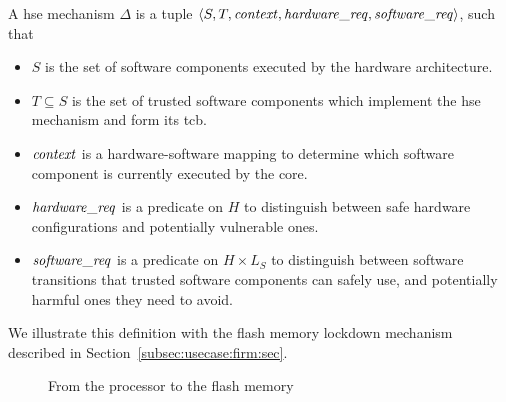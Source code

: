 \begin{definition}
  \label{def:speccert:hse}
  A \ac{hse} mechanism $\Delta$ is a tuple
  $\langle S, T, \mathit{context}, \mathit{hardware\_req}, \mathit{software\_req}
  \rangle$, such that
  \begin{itemize}
  \item $S$ is the set of software components executed by the hardware
    architecture.
  \item $T \subseteq S$ is the set of trusted software components which
    implement the \ac{hse} mechanism and form its \ac{tcb}.
  \item $\mathit{context}$ is a hardware-software mapping to determine which
    software component is currently executed by the core.
  \item $\mathit{hardware\_req}$ is a predicate on $H$ to distinguish between safe
    hardware configurations and potentially vulnerable ones.
  \item $\mathit{software\_req}$ is a predicate on $H \times L_S$ to distinguish
    between software transitions that trusted software components can safely
    use, and potentially harmful ones they need to avoid.
  \end{itemize}
\end{definition}

We illustrate this definition with the flash memory lockdown mechanism described
in Section~\ref{subsec:usecase:firm:sec}.

\begin{figure}
  \centering

  \caption{From the processor to the flash memory}
  \label{fig:speccert:flash}
\end{figure}


